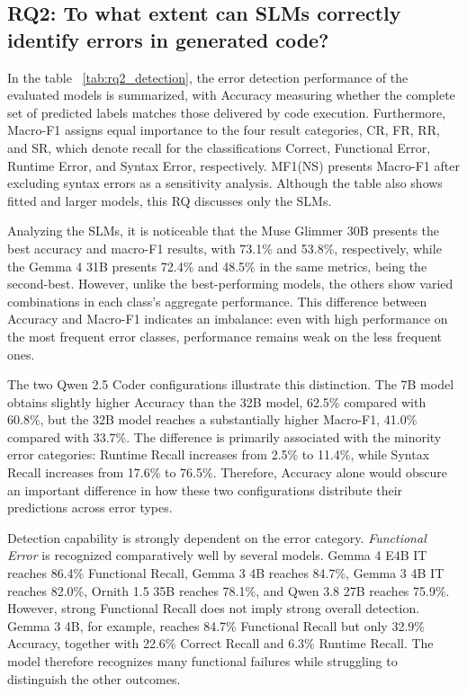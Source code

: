 \subsection{RQ2: To what extent can SLMs correctly identify errors in generated code?}
\label{sec:rq2}

In the table ~\ref{tab:rq2_detection}, the error detection performance of the evaluated models is summarized, with Accuracy measuring whether the complete set of predicted labels matches those delivered by code execution. Furthermore, Macro-F1 assigns equal importance to the four result categories, CR, FR, RR, and SR, which denote recall for the classifications Correct, Functional Error, Runtime Error, and Syntax Error, respectively. MF1(NS) presents Macro-F1 after excluding syntax errors as a sensitivity analysis. Although the table also shows fitted and larger models, this RQ discusses only the SLMs.

Analyzing the SLMs, it is noticeable that the Muse Glimmer 30B presents the best accuracy and macro-F1 results, with 73.1\% and 53.8\%, respectively, while the Gemma 4 31B presents 72.4\% and 48.5\% in the same metrics, being the second-best. However, unlike the best-performing models, the others show varied combinations in each class's aggregate performance. This difference between Accuracy and Macro-F1 indicates an imbalance: even with high performance on the most frequent error classes, performance remains weak on the less frequent ones.

The two Qwen 2.5 Coder configurations illustrate this distinction. The 7B model obtains slightly higher Accuracy than the 32B model, 62.5\% compared with 60.8\%, but the 32B model reaches a substantially higher Macro-F1, 41.0\% compared with 33.7\%. The difference is primarily associated with the minority error categories: Runtime Recall increases from 2.5\% to 11.4\%, while Syntax Recall increases from 17.6\% to 76.5\%. Therefore, Accuracy alone would obscure an important difference in how these two configurations distribute their predictions across error types.

Detection capability is strongly dependent on the error category. \emph{Functional Error} is recognized comparatively well by several models. Gemma 4 E4B IT reaches 86.4\% Functional Recall, Gemma 3 4B reaches 84.7\%, Gemma 3 4B IT reaches 82.0\%, Ornith 1.5 35B reaches 78.1\%, and Qwen 3.8 27B reaches 75.9\%. However, strong Functional Recall does not imply strong overall detection. Gemma 3 4B, for example, reaches 84.7\% Functional Recall but only 32.9\% Accuracy, together with 22.6\% Correct Recall and 6.3\% Runtime Recall. The model therefore recognizes many functional failures while struggling to distinguish the other outcomes.


